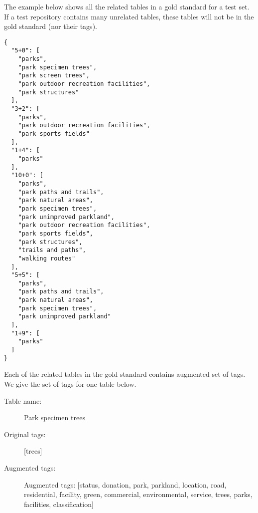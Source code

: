The example below shows all the related tables in a gold standard for a test set. If a test repository contains many unrelated tables, these tables will not be in the gold standard (nor their tags).
\begin{lstlisting}
{
  "5+0": [
    "parks",
    "park specimen trees",
    "park screen trees",
    "park outdoor recreation facilities",
    "park structures"
  ],
  "3+2": [
    "parks",
    "park outdoor recreation facilities",
    "park sports fields"
  ],
  "1+4": [
    "parks"
  ],
  "10+0": [
    "parks",
    "park paths and trails",
    "park natural areas",
    "park specimen trees",
    "park unimproved parkland",
    "park outdoor recreation facilities",
    "park sports fields",
    "park structures",
    "trails and paths",
    "walking routes"
  ],
  "5+5": [
    "parks",
    "park paths and trails",
    "park natural areas",
    "park specimen trees",
    "park unimproved parkland"
  ],
  "1+9": [
    "parks"
  ]
}
\end{lstlisting}

Each of the related tables in the gold standard contains augmented set of tags. We give the set of tags for one table below.

\begin{description}
\item[Table name:]Park specimen trees
\item[Original tags:][trees]
\item[Augmented tags:]Augmented tags: [status, donation, park, parkland, location, road, residential, facility, green, commercial, environmental, service, trees, parks, facilities, classification]
\end{description}